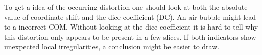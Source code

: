 
To get a idea of the occurring distortion one should look at both the absolute value of coordinate shift and the dice-coefficient (DC).
An air bubble might lead to a incorrect COM.
Without looking at the dice-coefficient it is hard to tell why this distortion only appears to be present in a few slices.
If both indicators show unexpected local irregularities, a conclusion might be easier to draw.




